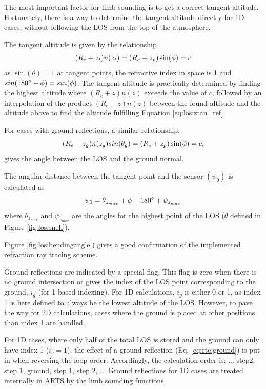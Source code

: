   The most important factor for limb sounding is to get a correct
  tangent altitude. Fortunately, there is a way to determine the
  tangent altitude directly for 1D cases, without following the LOS
  from the top of the atmosphere.

  The tangent altitude is given by the relationship
  \begin{equation}
    (R_e+z_t)n(z_t) = (R_e+z_p)\sin(\phi) = c
   \label{eq:los:ztan_ref}
  \end{equation}
  as $\sin(\theta)=1$ at tangent points, the refractive index in space
  is 1 and $sin(180^{\circ}-\phi)=sin(\phi)$. The tangent altitude
  is practically determined by finding the highest altitude where
  $(R_e+z)n(z)$ exceeds the value of $c$, followed by an interpolation
  of the product $(R_e+z)n(z)$ between the found altitude and the
  altitude above to find the altitude fulfilling Equation
  \ref{eq:los:ztan_ref}.
 
  For cases with ground reflections, a similar relationship,
  \begin{equation}
    (R_e+z_g)n(z_g)sin(\theta_g) = (R_e+z_p)\sin(\phi) = c,
  \end{equation}
  gives the angle between the LOS and the ground normal.

  The angular distance between the tangent point and the sensor $(\psi_0)$
  is calculated as
  \begin{equation}
    \psi_0 = \theta_{z_{max}} + \phi  - 180^\circ + \psi_{z_{max}}
  \end{equation}
  where $\theta_{z_{max}}$ and $\psi_{z_{max}}$ are the angles for the
  highest point of the LOS ($\theta$ defined in Figure \ref{fig:los:snell}).
  
  Figure \ref{fig:los:bendingangle}) gives a good confirmation of the
  implemented refraction ray tracing scheme.

  
  
  \label{sec:los:ground}
  
  Ground reflections are indicated by a special flag. This flag is
  zero when there is no ground intersection or gives the index of the
  LOS point corresponding to the ground, $i_g$ (for 1-based indexing).
  For 1D calculations, $i_g$ is either 0 or 1, as index 1 is here
  defined to always be the lowest altitude of the LOS. However, to
  pave the way for 2D calculations, cases where the ground is placed
  at other positions than index 1 are handled.
  
  For 1D cases, where only half of the total LOS is stored and the
  ground can only have index 1 ($i_g=1$), the effect of a ground
  reflection (Eq. \ref{eq:rte:ground}) is put in when reversing the
  loop order. Accordingly, the calculation order is: ... step2, step
  1, ground, step 1, step 2, ... Ground reflections for 1D cases are
  treated internally in ARTS by the limb sounding functions.
  
